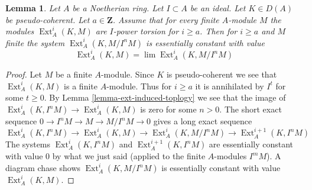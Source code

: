 \documentclass[10pt,a4paper]{amsart}
\theoremstyle{plain}
\newtheorem{lemma}[subsection]{Lemma}
\theoremstyle{definition}
\theoremstyle{remark}
\numberwithin{equation}{subsection}
\def\lim{\mathop{\mathrm{lim}}\nolimits}
\def\Ext{\mathop{\mathrm{Ext}}\nolimits}
\begin{document}
\begin{lemma}
\label{lemma-ext-annihilated-into}
Let $A$ be a Noetherian ring. Let $I \subset A$ be an ideal.
Let $K \in D(A)$ be pseudo-coherent. Let $a \in \mathbf{Z}$.
Assume that for every finite $A$-module $M$ the modules
$\Ext^i_A(K, M)$ are $I$-power torsion for $i \geq a$.
Then for $i \geq a$ and $M$ finite
the system $\Ext^i_A(K, M/I^nM)$
is essentially constant with value
$$
\Ext^i_A(K, M) = \lim \Ext^i_A(K, M/I^nM)
$$
\end{lemma}

\begin{proof}
Let $M$ be a finite $A$-module. Since $K$ is pseudo-coherent we see that
$\Ext^i_A(K, M)$ is a finite $A$-module. Thus for $i \geq a$
it is annihilated by $I^t$ for some $t \geq 0$. By
Lemma \ref{lemma-ext-induced-toplogy} we see that the image of
$\Ext^i_A(K, I^nM) \to \Ext^i_A(K, M)$ is
zero for some $n > 0$.
The short exact sequence $0 \to I^nM \to M \to M/I^n M \to 0$
gives a long exact sequence
$$
\Ext^i_A(K, I^nM) \to \Ext^i_A(K, M) \to
\Ext^i_A(K, M/I^nM) \to \Ext^{i + 1}_A(K, I^nM)
$$
The systems $\Ext^i_A(K, I^nM)$ and $\Ext^{i + 1}_A(K, I^nM)$
are essentially constant with value $0$ by what we just said
(applied to the finite $A$-modules $I^mM$). A diagram chase
shows $\Ext^i_A(K, M/I^nM)$ is essentially constant with value
$\Ext^i_A(K, M)$.
\end{proof}
\end{document}
